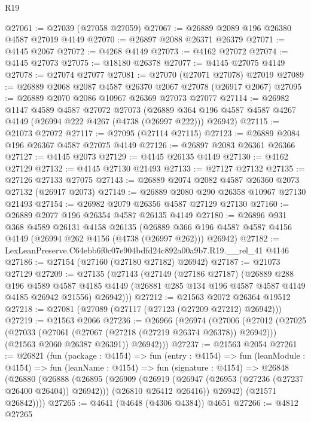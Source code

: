 \begin{lexlean}{R19}
\begin{coremodule}
@27061 := @27039 (@27058 @27059)
@27067 := @26889 @2089 @196 @26380 @4587 @27019 @4149
@27070 := @26897 @2088 @26371 @26379
@27071 := @4145 @2067
@27072 := @4268 @4149
@27073 := @4162 @27072
@27074 := @4145 @27073
@27075 := @18180 @26378
@27077 := @4145 @27075 @4149
@27078 := @27074 @27077
@27081 := @27070 (@27071 @27078) @27019
@27089 := @26889 @2068 @2087 @4587 @26370 @2067 @27078 (@26917 @2067)
@27095 := @26889 @2070 @2086 @10967 @26369 @27073 @27077
@27114 := @26982
    @1147
    @4589
    @4587
    @27072
    @27073
    (@26889 @364 @196 @4587 @4587 @4267 @4149 (@26994 @222 @4267 (@4738 (@26997 @222))) @26942)
@27115 := @21073 @27072
@27117 := @27095 (@27114 @27115)
@27123 := @26889 @2084 @196 @26367 @4587 @27075 @4149
@27126 := @26897 @2083 @26361 @26366
@27127 := @4145 @2073
@27129 := @4145 @26135 @4149
@27130 := @4162 @27129
@27132 := @4145 @27130 @21493
@27133 := @27127 @27132
@27135 := @27126 @27133 @27075
@27143 := @26889 @2074 @2082 @4587 @26360 @2073 @27132 (@26917 @2073)
@27149 := @26889 @2080 @290 @26358 @10967 @27130 @21493
@27154 := @26982 @2079 @26356 @4587 @27129 @27130
@27160 := @26889 @2077 @196 @26354 @4587 @26135 @4149
@27180 := @26896
    @931
    @368
    @4589
    @26131
    @4158
    @26135
    (@26889 @366 @196 @4587 @4587 @4156 @4149 (@26994 @262 @4156 (@4738 (@26997 @262))) @26942)
@27182 := LexLeanPreserve.C64ebb6f0c07e904bdfd24c892a00a9b7.R19.__rel_41 @4146
@27186 := @27154 (@27160 (@27180 @27182) @26942)
@27187 := @21073 @27129
@27209 := @27135
    (@27143
      (@27149
        (@27186 @27187)
        (@26889
          @288
          @196
          @4589
          @4587
          @4185
          @4149
          (@26881 @285 @134 @196 @4587 @4587 @4149 @4185 @26942 @21556)
          @26942)))
@27212 := @21563 @2072 @26364 @19512
@27218 := @27081 (@27089 (@27117 (@27123 (@27209 @27212) @26942)))
@27219 := @21563 @2066
@27236 := @26966
    (@26974
      (@27006
        (@27012
          (@27025
            (@27033 (@27061 (@27067 (@27218 (@27219 @26374 @26378)) @26942)))
            (@21563 @2060 @26387 @26391))
          @26942)))
@27237 := @21563 @2054
@27261 := @26821
    (fun (package : @4154) =>
    fun (entry : @4154) =>
    fun (leanModule : @4154) =>
    fun (leanName : @4154) =>
    fun (signature : @4154) =>
    @26848
      (@26880
        (@26888
          (@26895
            (@26909
              (@26919 (@26947 (@26953 (@27236 (@27237 @26400 @26404)) @26942)))
              (@26810 @26412 @26416))
            @26942)
          (@21571 @26842))))
@27265 := @4641 (@4648 (@4306 @4384)) @4651
@27266 := @4812 @27265

\end{coremodule}
\end{lexlean}
